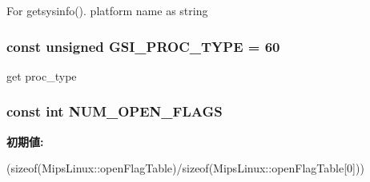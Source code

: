 For getsysinfo(). platform name as string \hypertarget{classMipsLinux_a3048b7c97d8a7e86854cdb73520560d0}{
\subsubsection[{GSI\_\-PROC\_\-TYPE}]{\setlength{\rightskip}{0pt plus 5cm}const unsigned {\bf GSI\_\-PROC\_\-TYPE} = 60}}
\label{classMipsLinux_a3048b7c97d8a7e86854cdb73520560d0}


get proc\_\-type \hypertarget{classMipsLinux_ad85b9918c8f2c8739537a002dc1dc526}{
\subsubsection[{NUM\_\-OPEN\_\-FLAGS}]{\setlength{\rightskip}{0pt plus 5cm}const int {\bf NUM\_\-OPEN\_\-FLAGS}}}
\label{classMipsLinux_ad85b9918c8f2c8739537a002dc1dc526}
{\bfseries 初期値:}
\begin{DoxyCode}

        (sizeof(MipsLinux::openFlagTable)/sizeof(MipsLinux::openFlagTable[0]))
\end{DoxyCode}


